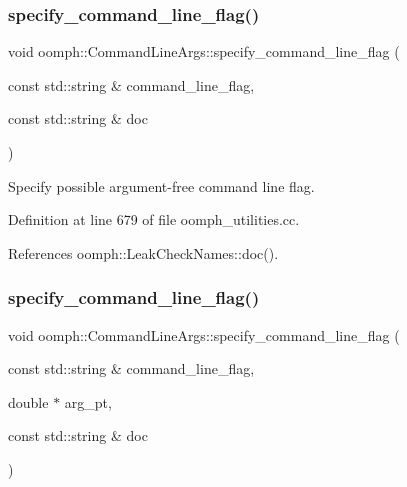 \subsubsection{\texorpdfstring{specify\+\_\+command\+\_\+line\+\_\+flag()}{specify\_command\_line\_flag()}\hspace{0.1cm}{\footnotesize\ttfamily [1/5]}}
{\footnotesize\ttfamily void oomph\+::\+Command\+Line\+Args\+::specify\+\_\+command\+\_\+line\+\_\+flag (\begin{DoxyParamCaption}\item[{const std\+::string \&}]{command\+\_\+line\+\_\+flag,  }\item[{const std\+::string \&}]{doc }\end{DoxyParamCaption})}



Specify possible argument-\/free command line flag. 



Definition at line 679 of file oomph\+\_\+utilities.\+cc.



References oomph\+::\+Leak\+Check\+Names\+::doc().

\mbox{\label{namespaceoomph_1_1CommandLineArgs_a1ddbea55361272d5b057bd76ca9550f0}} 
\subsubsection{\texorpdfstring{specify\+\_\+command\+\_\+line\+\_\+flag()}{specify\_command\_line\_flag()}\hspace{0.1cm}{\footnotesize\ttfamily [2/5]}}
{\footnotesize\ttfamily void oomph\+::\+Command\+Line\+Args\+::specify\+\_\+command\+\_\+line\+\_\+flag (\begin{DoxyParamCaption}\item[{const std\+::string \&}]{command\+\_\+line\+\_\+flag,  }\item[{double $\ast$}]{arg\+\_\+pt,  }\item[{const std\+::string \&}]{doc }\end{DoxyParamCaption})}



